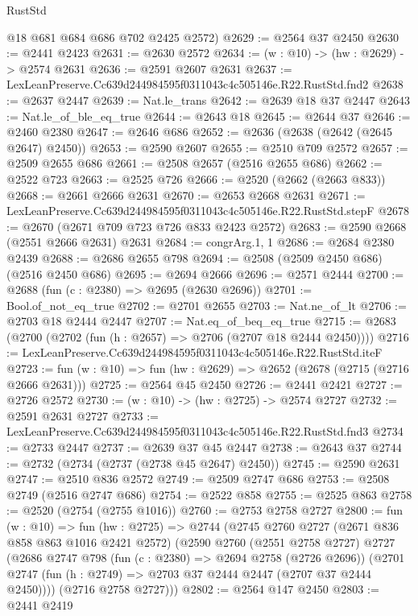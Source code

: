 \begin{lexlean}{RustStd}
\begin{coremodule}
      @18
      @681
      @684
      @686
      @702
      @2425
      @2572)
@2629 := @2564 @37 @2450
@2630 := @2441 @2423
@2631 := @2630 @2572
@2634 := (w : @10) -> (hw : @2629) -> @2574 @2631
@2636 := @2591 @2607 @2631
@2637 := LexLeanPreserve.Cc639d244984595f0311043c4c505146e.R22.RustStd.fnd2
@2638 := @2637 @2447
@2639 := Nat.le_trans
@2642 := @2639 @18 @37 @2447
@2643 := Nat.le_of_ble_eq_true
@2644 := @2643 @18
@2645 := @2644 @37
@2646 := @2460 @2380
@2647 := @2646 @686
@2652 := @2636 (@2638 (@2642 (@2645 @2647) @2450))
@2653 := @2590 @2607
@2655 := @2510 @709 @2572
@2657 := @2509 @2655 @686
@2661 := @2508 @2657 (@2516 @2655 @686)
@2662 := @2522 @723
@2663 := @2525 @726
@2666 := @2520 (@2662 (@2663 @833))
@2668 := @2661 @2666 @2631
@2670 := @2653 @2668 @2631
@2671 := LexLeanPreserve.Cc639d244984595f0311043c4c505146e.R22.RustStd.stepF
@2678 := @2670 (@2671 @709 @723 @726 @833 @2423 @2572)
@2683 := @2590 @2668 (@2551 @2666 @2631) @2631
@2684 := congrArg.{1, 1}
@2686 := @2684 @2380 @2439
@2688 := @2686 @2655 @798
@2694 := @2508 (@2509 @2450 @686) (@2516 @2450 @686)
@2695 := @2694 @2666
@2696 := @2571 @2444
@2700 := @2688 (fun (c : @2380) => @2695 (@2630 @2696))
@2701 := Bool.of_not_eq_true
@2702 := @2701 @2655
@2703 := Nat.ne_of_lt
@2706 := @2703 @18 @2444 @2447
@2707 := Nat.eq_of_beq_eq_true
@2715 := @2683 (@2700 (@2702 (fun (h : @2657) => @2706 (@2707 @18 @2444 @2450))))
@2716 := LexLeanPreserve.Cc639d244984595f0311043c4c505146e.R22.RustStd.iteF
@2723 := fun (w : @10) => fun (hw : @2629) => @2652 (@2678 (@2715 (@2716 @2666 @2631)))
@2725 := @2564 @45 @2450
@2726 := @2441 @2421
@2727 := @2726 @2572
@2730 := (w : @10) -> (hw : @2725) -> @2574 @2727
@2732 := @2591 @2631 @2727
@2733 := LexLeanPreserve.Cc639d244984595f0311043c4c505146e.R22.RustStd.fnd3
@2734 := @2733 @2447
@2737 := @2639 @37 @45 @2447
@2738 := @2643 @37
@2744 := @2732 (@2734 (@2737 (@2738 @45 @2647) @2450))
@2745 := @2590 @2631
@2747 := @2510 @836 @2572
@2749 := @2509 @2747 @686
@2753 := @2508 @2749 (@2516 @2747 @686)
@2754 := @2522 @858
@2755 := @2525 @863
@2758 := @2520 (@2754 (@2755 @1016))
@2760 := @2753 @2758 @2727
@2800 := fun (w : @10) =>
  fun (hw : @2725) =>
  @2744
    (@2745
      @2760
      @2727
      (@2671 @836 @858 @863 @1016 @2421 @2572)
      (@2590
        @2760
        (@2551 @2758 @2727)
        @2727
        (@2686
          @2747
          @798
          (fun (c : @2380) => @2694 @2758 (@2726 @2696))
          (@2701 @2747 (fun (h : @2749) => @2703 @37 @2444 @2447 (@2707 @37 @2444 @2450))))
        (@2716 @2758 @2727)))
@2802 := @2564 @147 @2450
@2803 := @2441 @2419

\end{coremodule}
\end{lexlean}
